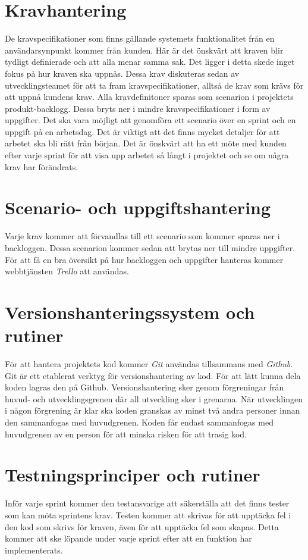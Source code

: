 \documentclass[a4paper,12pt,oneside,final]{extbook}
\begin{document}
\section{Kravhantering}
De kravspecifikationer som finns gällande systemets funktionalitet
från en användarsynpunkt kommer från kunden. Här är det önskvärt
att kraven blir tydligt definierade och att alla menar samma sak.
Det ligger i detta skede inget fokus på hur kraven ska uppnås.
Dessa krav diskuteras sedan av utvecklingsteamet för att ta fram
kravspecifikationer, alltså de krav som krävs för att uppnå kundens
krav. Alla kravdefinitoner sparas som scenarion i projektets
produkt-backlogg. Dessa bryts ner i mindre kravspecifikationer i form av
uppgifter. Det ska vara möjligt att genomföra ett scenario över en sprint
och en uppgift på en arbetsdag. Det är viktigt att det finns mycket
detaljer för att arbetet ska bli rätt från början. Det är önskvärt
att ha ett möte med kunden efter varje sprint för att visa upp
arbetet så långt i projektet och se om några krav har förändrats.

\section{Scenario- och uppgiftshantering}
Varje krav kommer att förvandlas till ett scenario som kommer sparas
ner i backloggen. Dessa scenarion kommer sedan att brytas ner till
mindre uppgifter. För att få en bra översikt på hur
backloggen och uppgifter hanteras kommer webbtjänsten \emph{Trello} att användas.

\section{Versionshanteringssystem och rutiner}
För att hantera projektets kod kommer \emph{Git} användas tillsammans med
\emph{Github}. Git är ett etablerat verktyg för versionshantering av kod.
För att lätt kunna dela koden lagras den på Github. Versionshantering
sker genom förgreningar från huvud- och utvecklingsgrenen där all
utveckling sker i grenarna. När utvecklingen i någon förgrening är
klar ska koden granskas av minst två andra personer innan den
sammanfogas med huvudgrenen. Koden får endast sammanfogas med
huvudgrenen av en person för att minska risken för att trasig kod.

\section{Testningsprinciper och rutiner}
Inför varje sprint kommer den testansvarige att säkerställa att det
finns tester som kan möta sprintens krav. Testen kommer att skrivas
för att upptäcka fel i den kod som skrivs för kraven, även för att
upptäcka fel som skapas. Detta kommer att ske löpande under varje
sprint efter att en funktion har implementerats.
\end{document}

